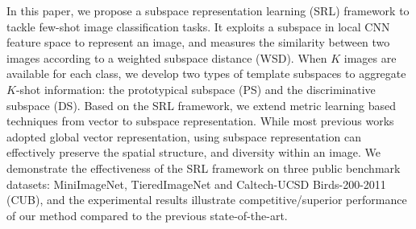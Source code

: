 In this paper, we propose a subspace representation learning (SRL) framework to tackle few-shot image classification tasks.
It exploits a subspace in local CNN feature space to represent an image, and measures the similarity between two images according to a weighted subspace distance (WSD).
When $K$ images are available for each class, we develop two types of template subspaces to aggregate $K$-shot information: the prototypical subspace (PS) and the discriminative subspace (DS).
Based on the SRL framework, we extend metric learning based techniques from vector to subspace representation.
While most previous works adopted global vector representation, using subspace representation can effectively preserve the spatial structure, and diversity within an image.
We demonstrate the effectiveness of the SRL framework on three public benchmark datasets: MiniImageNet, TieredImageNet and Caltech-UCSD Birds-200-2011 (CUB), and the experimental results illustrate competitive/superior performance of our method compared to the previous state-of-the-art.

